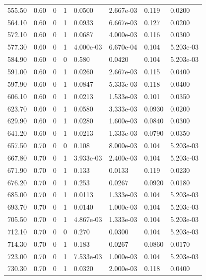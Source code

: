 \documentclass[preview]{standalone}
\begin{document}
{{{\begin{tabular}{L{1.2cm}C{1.2cm} C{0.3cm}C{0.5cm} C{1.4cm}C{1.4cm} C{1.4cm}C{1.4cm}}
  555.50  &  0.60  & 0     &  1 &  0.0500  & 2.667e-03  & 0.119 &  0.0200   \\ 
  564.10  &  0.60  & 0     &  1 &  0.0933  & 6.667e-03  & 0.127 &  0.0200   \\ 
  572.10  &  0.60  & 0     &  1 &  0.0687  & 4.000e-03  & 0.116 &  0.0300   \\ 
  577.30  &  0.60  & 0     &  1 &  4.000e-03  & 6.670e-04  & 0.104 &  5.203e-03   \\ 
  584.90  &  0.60  & 0     &  0 &  0.580  & 0.0420  & 0.104 &  5.203e-03   \\ 
  591.00  &  0.60  & 0     &  1 &  0.0260  & 2.667e-03  & 0.115 &  0.0400   \\ 
  597.90  &  0.60  & 0     &  1 &  0.0847  & 5.333e-03  & 0.118 &  0.0400   \\ 
  606.10  &  0.60  & 0     &  1 &  0.0213  & 1.533e-03  & 0.101 &  0.0350   \\ 
  623.70  &  0.60  & 0     &  1 &  0.0580  & 3.333e-03  & 0.0930 &  0.0200   \\ 
  629.90  &  0.60  & 0     &  1 &  0.0280  & 1.600e-03  & 0.0840 &  0.0300   \\ 
  641.20  &  0.60  & 0     &  1 &  0.0213  & 1.333e-03  & 0.0790 &  0.0350   \\ 
  657.50  &  0.70  & 0     &  0 &  0.108  & 8.000e-03  & 0.104 &  5.203e-03   \\ 
  667.80  &  0.70  & 0     &  1 &  3.933e-03  & 2.400e-03  & 0.104 &  5.203e-03   \\ 
  671.90  &  0.70  & 0     &  1 &  0.133  & 0.0133  & 0.119 &  0.0230   \\ 
  676.20  &  0.70  & 0     &  1 &  0.253  & 0.0267  & 0.0920 &  0.0180   \\ 
  685.00  &  0.70  & 0     &  1 &  0.0113  & 1.333e-03  & 0.104 &  5.203e-03   \\ 
  693.70  &  0.70  & 0     &  1 &  0.0140  & 1.000e-03  & 0.104 &  5.203e-03   \\ 
  705.50  &  0.70  & 0     &  1 &  4.867e-03  & 1.333e-03  & 0.104 &  5.203e-03   \\ 
  712.10  &  0.70  & 0     &  0 &  0.270  & 0.0300  & 0.104 &  5.203e-03   \\ 
  714.30  &  0.70  & 0     &  1 &  0.183  & 0.0267  & 0.0860 &  0.0170   \\ 
  723.00  &  0.70  & 0     &  1 &  7.533e-03  & 1.000e-03  & 0.104 &  5.203e-03   \\ 
  730.30  &  0.70  & 0     &  1 &  0.0320  & 2.000e-03  & 0.118 &  0.0400   \\ 

\end{tabular}}}}
\end{document}
